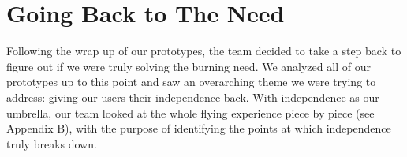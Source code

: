 \newpage


\section{Going Back to The Need}

Following the wrap up of our prototypes, the team decided to take a step back to figure out if we were truly solving the burning need. We analyzed all of our prototypes up to this point and saw an overarching theme we were trying to address: giving our users their independence back. With independence as our umbrella, our team looked at the whole flying experience piece by piece (see Appendix B), with the purpose of identifying the points at which independence truly breaks down. 

